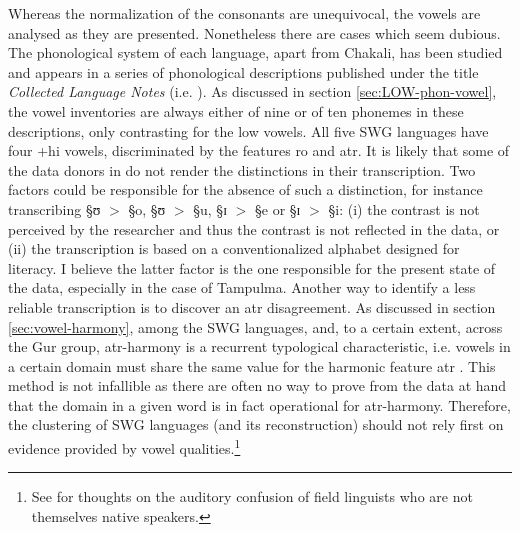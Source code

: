 Whereas the normalization of the consonants are unequivocal, the vowels are
analysed as they are presented. Nonetheless there are cases which seem dubious.
The phonological system of each language, apart from Chakali, has been
studied and appears in a series of phonological
descriptions published under the title   \textit{Collected Language Notes} (i.e.
\cite{Crou66, Gray69, Toup95,  Crou03}). As discussed in section
\ref{sec:LOW-phon-vowel}, the vowel inventories are always either of nine
or of ten phonemes  in
these
descriptions,  only contrasting for the low vowels.  All five
SWG languages  have four {\sc +hi} vowels, discriminated by the features {\sc
 ro} and {\sc
atr}. It is likely  that
some of the data donors in \cite{Chan09} do not render the distinctions in
their transcription.
Two factors could be
responsible for the absence of such a distinction, for instance transcribing 
{\S ʊ} $>$  {\S o},
{\S ʊ} $>$ {\S u},  {\S ɪ} $>$ {\S e} or {\S ɪ} $>$ {\S i}: (i) the contrast is
not perceived by the researcher and
thus
the contrast is not reflected in the data, or (ii) the transcription is based on
a conventionalized alphabet designed for literacy. I believe the latter factor
is the one responsible for the present state of the data, especially in the case
of Tampulma. Another way to identify a less reliable transcription  is to
discover an {\sc atr} disagreement.  As discussed in section
\ref{sec:vowel-harmony},  among the SWG languages, and, to a
certain
extent, across the Gur group, {\sc atr}-harmony is a recurrent typological
characteristic, i.e. vowels in a certain domain must share the same value for
the
 harmonic feature {\sc atr} \citep{Casa03}. This method is not infallible as
there are often no way
to prove from the data at hand that the domain in a given word is in fact
operational for  {\sc atr}-harmony.  Therefore, the clustering of SWG languages
(and
its
reconstruction)  should not rely first on evidence provided by vowel
qualities.\footnote{See
\citet[509-510]{Casa08} for thoughts on the auditory confusion of field
linguists who are not themselves native speakers.}

